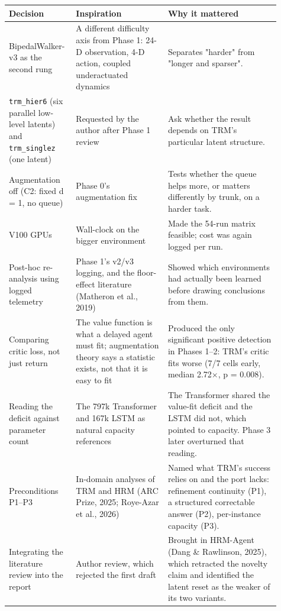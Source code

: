 \documentclass[11pt]{article}
\begin{document}
\begin{center}\small\begin{tabular}{>{\raggedright\arraybackslash}p{0.188\linewidth}>{\raggedright\arraybackslash}p{0.328\linewidth}>{\raggedright\arraybackslash}p{0.391\linewidth}}
\toprule
Decision & Inspiration & Why it mattered \\
\midrule
BipedalWalker-v3 as the second rung & A different difficulty axis from Phase 1: 24-D observation, 4-D action, coupled underactuated dynamics & Separates "harder" from "longer and sparser". \\
\texttt{trm\_hier6} (six parallel low-level latents) and \texttt{trm\_singlez} (one latent) & Requested by the author after Phase 1 review & Ask whether the result depends on TRM's particular latent structure. \\
Augmentation off (C2: fixed d = 1, no queue) & Phase 0's augmentation fix & Tests whether the queue helps more, or matters differently by trunk, on a harder task. \\
V100 GPUs & Wall-clock on the bigger environment & Made the 54-run matrix feasible; cost was again logged per run. \\
Post-hoc re-analysis using logged telemetry & Phase 1's v2/v3 logging, and the floor-effect literature (Matheron et al., 2019) & Showed which environments had actually been learned before drawing conclusions from them. \\
Comparing critic loss, not just return & The value function is what a delayed agent must fit; augmentation theory says a statistic exists, not that it is easy to fit & Produced the only significant positive detection in Phases 1--2: TRM's critic fits worse (7/7 cells early, median 2.72$\times$, p = 0.008). \\
Reading the deficit against parameter count & The 797k Transformer and 167k LSTM as natural capacity references & The Transformer shared the value-fit deficit and the LSTM did not, which pointed to capacity. Phase 3 later overturned that reading. \\
Preconditions P1--P3 & In-domain analyses of TRM and HRM (ARC Prize, 2025; Roye-Azar et al., 2026) & Named what TRM's success relies on and the port lacks: refinement continuity (P1), a structured correctable answer (P2), per-instance capacity (P3). \\
Integrating the literature review into the report & Author review, which rejected the first draft & Brought in HRM-Agent (Dang \& Rawlinson, 2025), which retracted the novelty claim and identified the latent reset as the weaker of its two variants. \\
\bottomrule
\end{tabular}\end{center}
\end{document}
